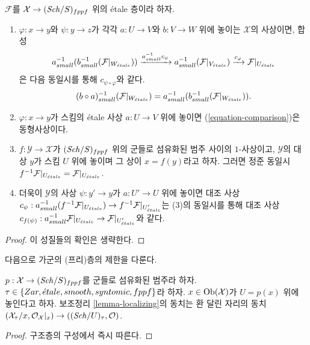 \begin{lemma}
\label{lemma-comparison}
$\mathcal{F}$를 $\mathcal{X} \to (\mathit{Sch}/S)_{fppf}$ 위의 \'etale 층이라 하자.
\begin{enumerate}
\item $\varphi : x \to y$와 $\psi : y \to z$가 각각
$a : U \to V$와 $b : V \to W$ 위에 놓이는 $\mathcal{X}$의 사상이면,
합성
$$
a_{small}^{-1}(b_{small}^{-1} (\mathcal{F}|_{W_{\acute{e}tale}}))
\xrightarrow{a_{small}^{-1}c_\psi}
a_{small}^{-1}(\mathcal{F}|_{V_{\acute{e}tale}})
\xrightarrow{c_\varphi}
\mathcal{F}|_{U_{\acute{e}tale}}
$$
은 다음 동일시를 통해 $c_{\psi \circ \varphi}$와 같다.
$$
(b \circ a)_{small}^{-1}(\mathcal{F}|_{W_{\acute{e}tale}}) =
a_{small}^{-1}(b_{small}^{-1} (\mathcal{F}|_{W_{\acute{e}tale}})).
$$
\item $\varphi : x \to y$가 스킴의 \'etale 사상 $a : U \to V$
위에 놓이면 (\ref{equation-comparison})은 동형사상이다.
\item $f : \mathcal{Y} \to \mathcal{X}$가 $(\mathit{Sch}/S)_{fppf}$ 위의
군들로 섬유화된 범주 사이의 $1$-사상이고, $\mathcal{Y}$의 대상
$y$가 스킴 $U$ 위에 놓이며 그 상이 $x = f(y)$라고 하자.
그러면 정준 동일시
$f^{-1}\mathcal{F}|_{U_{\acute{e}tale}} = \mathcal{F}|_{U_{\acute{e}tale}}$.
\item 더욱이 $\mathcal{Y}$의 사상 $\psi : y' \to y$가
$a : U' \to U$ 위에 놓이면 대조 사상
$c_\psi : a_{small}^{-1}(f^{-1}\mathcal{F}|_{U_{\acute{e}tale}}) \to
f^{-1}\mathcal{F}|_{U'_{\acute{e}tale}}$는 (3)의 동일시를 통해 대조 사상
$c_{f(\psi)} : a_{small}^{-1}\mathcal{F}|_{U_{\acute{e}tale}}
\to \mathcal{F}|_{U'_{\acute{e}tale}}$와 같다.
\end{enumerate}
\end{lemma}

\begin{proof}
이 성질들의 확인은 생략한다.
\end{proof}

\noindent
다음으로 가군의 (프리)층의 제한을 다룬다.

\begin{lemma}
\label{lemma-localizing-structure-sheaf}
$p : \mathcal{X} \to (\mathit{Sch}/S)_{fppf}$를 군들로 섬유화된 범주라 하자.
$\tau \in \{Zar, {\acute{e}tale}, smooth, syntomic, fppf\}$라 하자.
$x \in \mathop{\mathrm{Ob}}\nolimits(\mathcal{X})$가 $U = p(x)$ 위에 놓인다고 하자.
보조정리 \ref{lemma-localizing}의 동치는 환 달린 자리의 동치
$(\mathcal{X}_\tau/x, \mathcal{O}_\mathcal{X}|_x) \to
((\mathit{Sch}/U)_\tau, \mathcal{O})$.
\end{lemma}

\begin{proof}
구조층의 구성에서 즉시 따른다.
\end{proof}

